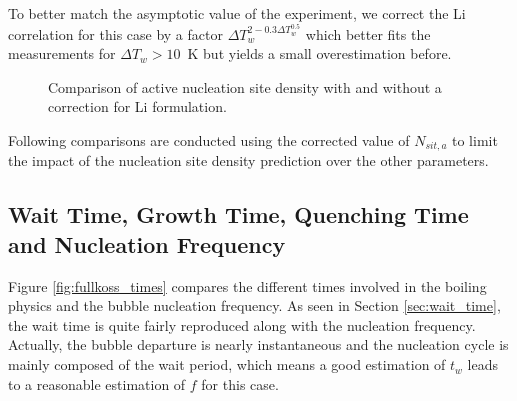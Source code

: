 \npar

To better match the asymptotic value of the experiment, we correct the Li \etal correlation for this case by a factor $\Delta T_{w}^{2-0.3\Delta T_{w}^{0.5}}$ which better fits the measurements for $\Delta T_{w}>10$~K but yields a small overestimation before.


\begin{figure}[!h]
\caption{Comparison of active nucleation site density with and without a correction for Li \etal formulation.}
\label{fig:fullkoss_nsit}
\end{figure}



\begin{note*}{}
Following comparisons are conducted using the corrected value of $N_{sit,a}$ to limit the impact of the nucleation site density prediction over the other parameters.
\end{note*}

\subsection{Wait Time, Growth Time, Quenching Time and Nucleation Frequency}

Figure \ref{fig:fullkoss_times} compares the different times involved in the boiling physics and the bubble nucleation frequency. As seen in Section \ref{sec:wait_time}, the wait time is quite fairly reproduced along with the nucleation frequency. Actually, the bubble departure is nearly instantaneous and the nucleation cycle is mainly composed of the wait period, which means a good estimation of $t_{w}$ leads to a reasonable estimation of $f$ for this case.

